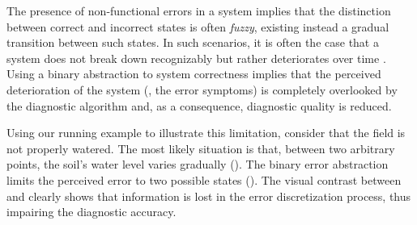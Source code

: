 The presence of non-functional errors in a system implies that the
distinction between correct and incorrect states is often
\textit{fuzzy}, existing instead a gradual transition between such states.
%
In such scenarios, it is often the case that a system does not break
down recognizably but rather deteriorates over time \citep{Ghosh07}.
%
Using a binary abstraction to system correctness implies that the
perceived deterioration of the system (\ie, the error symptoms) is
completely overlooked by the diagnostic algorithm and, as a
consequence, diagnostic quality is reduced.

Using our running example to illustrate this limitation, consider that
the field is not properly watered.
%
The most likely situation is that, between two arbitrary points, the
soil's water level varies gradually
().
%
The binary error abstraction limits the perceived error to two
possible states ().
%
The visual contrast between
 and
 clearly shows that
information is lost in the error discretization process, thus
impairing the diagnostic accuracy.


